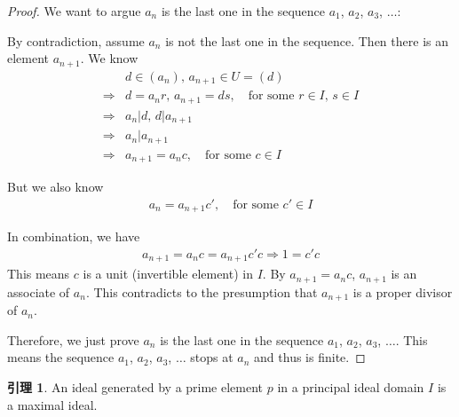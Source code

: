 \documentclass[utf8]{ctexbook}
\theoremstyle{definition}
\newtheorem{lemma}{引理}[section]
\begin{document}
\begin{proof}
We want to argue $a_n$ is the last one in the sequence $a_1$, $a_2$, $a_3$, $\ldots$: 

By contradiction, assume $a_n$ is not the last one in the sequence. Then there is an element $a_{n+1}$. We know
\begin{align*}
& d \in (a_n), \, a_{n+1} \in U = (d) \\
\Longrightarrow & d = a_n r, \,  a_{n+1} = d s, \quad \mbox{for some } r \in I, \, s \in I \\
\Longrightarrow & a_n | d, \, d | a_{n+1} \\
\Longrightarrow & a_n | a_{n+1} \\
\Longrightarrow & a_{n+1} = a_n c, \quad \mbox{for some } c \in I
\end{align*}

But we also know 
\begin{align*}
a_{n} = a_{n+1} c', \quad \mbox{for some } c' \in I
\end{align*}

In combination, we have
\begin{align*}
a_{n+1} = a_n c = a_{n+1} c' c \Longrightarrow 1 = c' c
\end{align*}
This means $c$ is a unit (invertible element) in $I$. By $a_{n+1} = a_n c$, $a_{n+1}$ is an associate of $a_n$. This contradicts to the presumption that $a_{n+1}$ is a proper divisor of $a_n$. 

Therefore, we just prove $a_n$ is the last one in the sequence $a_1$, $a_2$, $a_3$, $\ldots$. This means the sequence $a_1$, $a_2$, $a_3$, $\ldots$ stops at $a_n$ and thus is finite.

\end{proof}


\begin{lemma}
\label{lemma_principal_ideal_domain_UFD_2}
An ideal generated by a prime element $p$ in a principal ideal domain $I$ is a maximal ideal.
\end{lemma}
\end{document}
